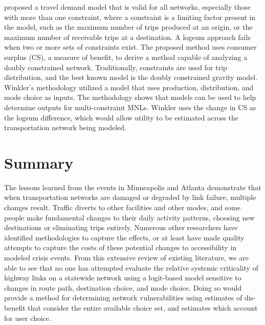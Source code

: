 \citet{winkler2016} proposed a travel demand model that is valid for all
networks,
especially those with more than one constraint, where a constraint is a limiting factor
present in the model, such as the maximum number of trips produced at an origin, or
the maximum number of receivable trips at a destination. A logsum approach fails when two
or more sets of constraints exist. The proposed method uses consumer surplus (CS), a measure of benefit,
to derive a method capable of analyzing a doubly constrained network. Traditionally,
constraints are used for trip distribution, and the best known model is the doubly constrained
gravity model. Winkler’s methodology utilized a
model that uses production, distribution, and mode choice as inputs. The
methodology shows that models can be used to help determine outputs for
multi-constraint MNLs. Winkler uses the change in CS as the logsum difference, which
would allow utility to be estimated across the transportation network
being modeled.

\section{Summary}

The lessons learned from the events in Minneapolis and Atlanta demonstrate
that when
transportation networks are damaged or degraded by link failure, multiple
changes result. Traffic
diverts to other facilities and other modes, and some people make
fundamental changes to their
daily activity patterns, choosing new destinations or eliminating trips
entirely. Numerous other
researchers have identified methodologies to capture the effects, or at
least have made quality attempts to capture the costs of these
potential changes to accessibility in modeled crisis events.
From this extensive review of existing literature, we are able to see that no
one has attempted evaluate the relative systemic
criticality of highway links on a statewide network using a logit-based model
sensitive to changes in route path, destination choice, and mode choice. Doing so would
provide a method for determining network vulnerabilities using estimates of dis-benefit
that consider the entire available choice set, and estimates which account for user choice.
